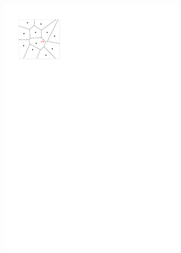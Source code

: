 \begin{figure}
\begin{subfigure}[b]{0.3\linewidth}
    \includegraphics[width=\textwidth,page=2]{figs/laplace.pdf}
    \caption{}\label{fig:nnc}
  \end{subfigure}
  \begin{subfigure}[b]{0.3\linewidth}
    \centering

\end{subfigure}
\end{figure}
